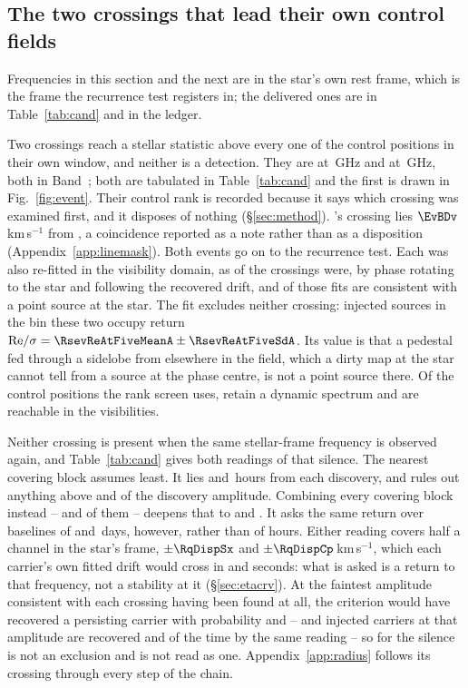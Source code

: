 \subsection{The two crossings that lead their own control fields}
\label{sec:vistest}

Frequencies in this section and the next are in the star's own rest frame,
which is the frame the recurrence test registers in; the delivered ones are in
Table~\ref{tab:cand} and in the ledger.

Two crossings reach a stellar statistic above every one of the \NCtrl{}
control positions in their own window, and neither is a detection. They are
\EvAStar{} at \RqFreqSx\,GHz and \EvBStar{} at \RqFreqCp\,GHz, both in
Band~\EvABand; both are tabulated in Table~\ref{tab:cand} and the first is
drawn in Fig.~\ref{fig:event}. Their control rank is recorded because it says which crossing was examined
first, and it disposes of nothing (\S\ref{sec:method}).
\EvBStar's crossing lies $\EvBDv$\,km\,s$^{-1}$ from \EvBLine, a coincidence
reported as a note rather than as a disposition
(Appendix~\ref{app:linemask}). Both events go on to the recurrence test. Each was also re-fitted in the visibility domain, as \LgNFit{} of the
\NCross{} crossings were, by phase rotating to the star and following the
recovered drift, and \LgNLocalCor{} of those fits are consistent with a point
source at the star. The fit excludes neither crossing: injected sources in
the bin these two occupy return
${\rm Re}/\sigma=\RsevReAtFiveMeanA\pm\RsevReAtFiveSdA$. Its value is that a pedestal fed through a sidelobe from elsewhere in
the field, which a dirty map at the star cannot tell from a source at the
phase centre, is not a point source there. Of the \NCtrl{} control positions
the rank screen uses, \RcNRetCtrl{} retain a dynamic spectrum and
\RcNVisCtrl{} are reachable in the visibilities.

Neither crossing is present when the same stellar-frame frequency is observed
again, and Table~\ref{tab:cand} gives both readings of that silence. The nearest covering block assumes least. It lies \RcSxNearH{} and
\EvBDeepH\,hours from each discovery, and rules out anything above
\RqNearFracSx{} and \RqNearFracCp{} of the discovery amplitude. Combining every covering block instead -- \RqNRepSx{} and \RqNRepCp{} of
them -- deepens that to \RcSxFive{} and \RcCpFive. It asks the same return
over baselines of \RqSpanDSx{} and \RqSpanDCp\,days, however, rather than of
hours. Either
reading covers half a channel in the star's frame, $\pm\RqDispSx$ and
$\pm\RqDispCp$\,km\,s$^{-1}$, which each carrier's own fitted drift would
cross in \ZtSxLeaveSec{} and \ZtCpLeaveSec{} seconds: what is asked is a
return to that frequency, not a stability at it (\S\ref{sec:etacrv}). At the faintest amplitude consistent with each crossing
having been found at all, the criterion would have recovered a persisting
carrier with probability \RqPowerTrigSx{} and \RqPowerTrigCp{} -- and
injected carriers at that amplitude are recovered \RjMeasSx{} and
\RjMeasCp{} of the time by the same reading -- so for
\EvBStar{} the silence is not an exclusion and is not read as one.
Appendix~\ref{app:radius} follows its crossing through every step
of the chain.


